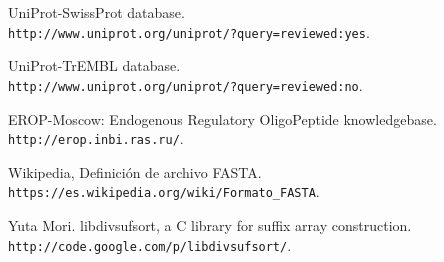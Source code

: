 \documentclass[letterpaper, 10pt, notitlepage]{report}
\newlength{\defbaselineskip}
\newcommand{\singlespacing}{\setlength{\baselineskip}{\defbaselineskip}}
\begin{document}
\begin{thebibliography}{9}
UniProt-SwissProt database.
\\\texttt{http://www.uniprot.org/uniprot/?query=reviewed:yes}.

UniProt-TrEMBL database.
\\\texttt{http://www.uniprot.org/uniprot/?query=reviewed:no}.

EROP-Moscow: Endogenous Regulatory OligoPeptide knowledgebase.
\\\texttt{http://erop.inbi.ras.ru/}.

Wikipedia, Definición de archivo FASTA.
\\\texttt{https://es.wikipedia.org/wiki/Formato\_FASTA}.

Yuta Mori. libdivsufsort, a C library for suffix array construction.
\\\texttt{http://code.google.com/p/libdivsufsort/}.

\end{thebibliography}

%




\singlespacing
\cleardoublepage
\end{document}
